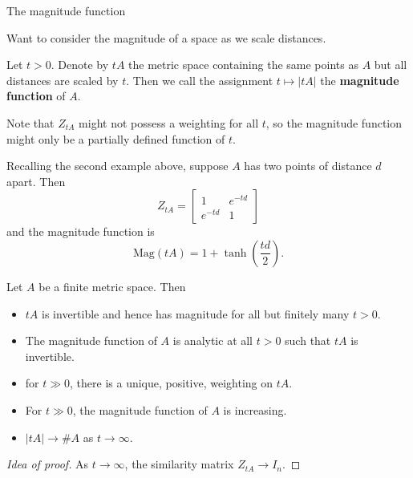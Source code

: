 \documentclass[12pt]{beamer}
\begin{document}
\begin{frame}[allowframebreaks]{The magnitude function}

Want to consider the magnitude of a space as we scale distances.

\begin{definition}
Let $t > 0$. Denote by $tA$ the metric space containing the same points as $A$ but all distances are scaled by $t$. Then we call the assignment $t\mapsto\vert tA\vert$ the \textbf{magnitude function} of $A$.
\end{definition}

Note that $Z_{tA}$ might not possess a weighting for all $t$, so the magnitude function might only be a partially defined function of $t$.

\framebreak

\begin{example}
Recalling the second example above, suppose $A$ has two points of distance $d$ apart. Then
\begin{equation*}
Z_{tA} = \begin{bmatrix} 1 & e^{-td} \\ e^{-td} & 1 \end{bmatrix}
\end{equation*}
and the magnitude function is
\begin{equation*}
\text{Mag}(tA) = 1 + \tanh\left(\frac{td}{2}\right).
\end{equation*}
\end{example}

\begin{theorem}
Let $A$ be a finite metric space. Then
\begin{itemize}
\item $tA$ is invertible and hence has magnitude for all but finitely many $t > 0$.
\item The magnitude function of $A$ is analytic at all $t>0$ such that $tA$ is invertible.
\item for $t \gg 0$, there is a unique, positive, weighting on $tA$.
\item For $t \gg 0$, the magnitude function of $A$ is increasing.
\item $\vert tA \vert \to \#A$ as $t \to \infty$.
\end{itemize}
\end{theorem}

\begin{proof}[Idea of proof]\renewcommand{\qedsymbol}{}
As $t\to\infty$, the similarity matrix $Z_{tA} \to I_n$.
\end{proof}


\end{frame}
\end{document}

